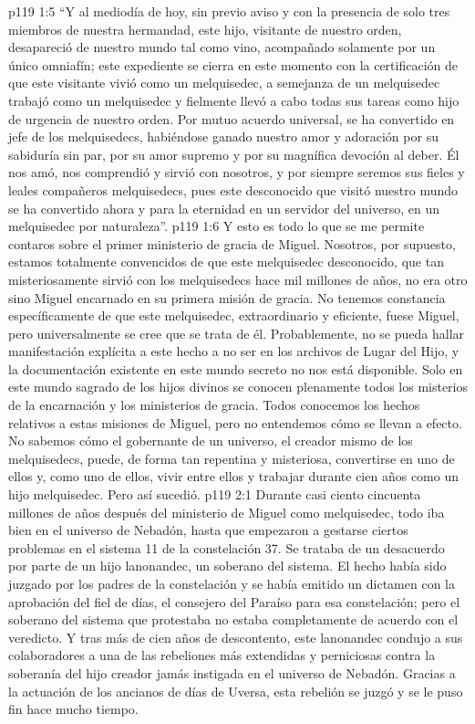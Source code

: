 \vs p119 1:5 “Y al mediodía de hoy, sin previo aviso y con la presencia de solo tres miembros de nuestra hermandad, este hijo, visitante de nuestro orden, desapareció de nuestro mundo tal como vino, acompañado solamente por un único omniafín; este expediente se cierra en este momento con la certificación de que este visitante vivió como un melquisedec, a semejanza de un melquisedec trabajó como un melquisedec y fielmente llevó a cabo todas sus tareas como hijo de urgencia de nuestro orden. Por mutuo acuerdo universal, se ha convertido en jefe de los melquisedecs, habiéndose ganado nuestro amor y adoración por su sabiduría sin par, por su amor supremo y por su magnífica devoción al deber. Él nos amó, nos comprendió y sirvió con nosotros, y por siempre seremos sus fieles y leales compañeros melquisedecs, pues este desconocido que visitó nuestro mundo se ha convertido ahora y para la eternidad en un servidor del universo, en un melquisedec por naturaleza”.
\vs p119 1:6 Y esto es todo lo que se me permite contaros sobre el primer ministerio de gracia de Miguel. Nosotros, por supuesto, estamos totalmente convencidos de que este melquisedec desconocido, que tan misteriosamente sirvió con los melquisedecs hace mil millones de años, no era otro sino Miguel encarnado en su primera misión de gracia. No tenemos constancia específicamente de que este melquisedec, extraordinario y eficiente, fuese Miguel, pero universalmente se cree que se trata de él. Probablemente, no se pueda hallar manifestación explícita a este hecho a no ser en los archivos de Lugar del Hijo, y la documentación existente en este mundo secreto no nos está disponible. Solo en este mundo sagrado de los hijos divinos se conocen plenamente todos los misterios de la encarnación y los ministerios de gracia. Todos conocemos los hechos relativos a estas misiones de Miguel, pero no entendemos cómo se llevan a efecto. No sabemos cómo el gobernante de un universo, el creador mismo de los melquisedecs, puede, de forma tan repentina y misteriosa, convertirse en uno de ellos y, como uno de ellos, vivir entre ellos y trabajar durante cien años como un hijo melquisedec. Pero así sucedió.
\vs p119 2:1 Durante casi ciento cincuenta millones de años después del ministerio de Miguel como melquisedec, todo iba bien en el universo de Nebadón, hasta que empezaron a gestarse ciertos problemas en el sistema 11 de la constelación 37. Se trataba de un desacuerdo por parte de un hijo lanonandec, un soberano del sistema. El hecho había sido juzgado por los padres de la constelación y se había emitido un dictamen con la aprobación del fiel de días, el consejero del Paraíso para esa constelación; pero el soberano del sistema que protestaba no estaba completamente de acuerdo con el veredicto. Y tras más de cien años de descontento, este lanonandec condujo a sus colaboradores a una de las rebeliones más extendidas y perniciosas contra la soberanía del hijo creador jamás instigada en el universo de Nebadón. Gracias a la actuación de los ancianos de días de Uversa, esta rebelión se juzgó y se le puso fin hace mucho tiempo.
